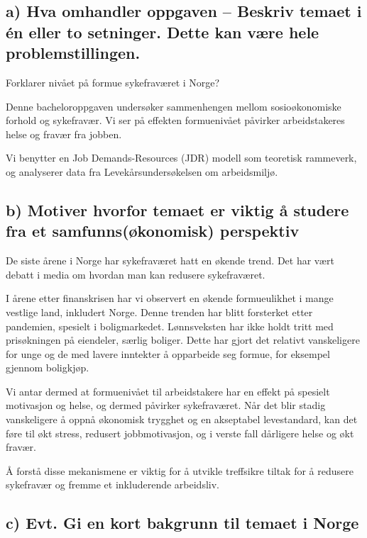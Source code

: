 \documentclass[
  12pt,
  a4paper,
  DIV=11,
  numbers=noendperiod]{scrartcl}
\begin{document}
\subsection{a) Hva omhandler oppgaven -- Beskriv temaet i én eller to
setninger. Dette kan være hele
problemstillingen.}\label{a-hva-omhandler-oppgaven-beskriv-temaet-i-uxe9n-eller-to-setninger.-dette-kan-vuxe6re-hele-problemstillingen.}

Forklarer nivået på formue sykefraværet i Norge?

Denne bacheloroppgaven undersøker sammenhengen mellom sosioøkonomiske
forhold og sykefravær. Vi ser på effekten formuenivået påvirker
arbeidstakeres helse og fravær fra jobben.

Vi benytter en Job Demands-Resources (JDR) modell som teoretisk
rammeverk, og analyserer data fra Levekårsundersøkelsen om arbeidsmiljø.

\subsection{b) Motiver hvorfor temaet er viktig å studere fra et
samfunns(økonomisk)
perspektiv}\label{b-motiver-hvorfor-temaet-er-viktig-uxe5-studere-fra-et-samfunnsuxf8konomisk-perspektiv}

De siste årene i Norge har sykefraværet hatt en økende trend. Det har
vært debatt i media om hvordan man kan redusere sykefraværet.

I årene etter finanskrisen har vi observert en økende formueulikhet i
mange vestlige land, inkludert Norge. Denne trenden har blitt forsterket
etter pandemien, spesielt i boligmarkedet. Lønnsveksten har ikke holdt
tritt med prisøkningen på eiendeler, særlig boliger. Dette har gjort det
relativt vanskeligere for unge og de med lavere inntekter å opparbeide
seg formue, for eksempel gjennom boligkjøp.

Vi antar dermed at formuenivået til arbeidstakere har en effekt på
spesielt motivasjon og helse, og dermed påvirker sykefraværet. Når det
blir stadig vanskeligere å oppnå økonomisk trygghet og en akseptabel
levestandard, kan det føre til økt stress, redusert jobbmotivasjon, og i
verste fall dårligere helse og økt fravær.

Å forstå disse mekanismene er viktig for å utvikle treffsikre tiltak for
å redusere sykefravær og fremme et inkluderende arbeidsliv.

\subsection{c) Evt. Gi en kort bakgrunn til temaet i
Norge}\label{c-evt.-gi-en-kort-bakgrunn-til-temaet-i-norge}
\end{document}
